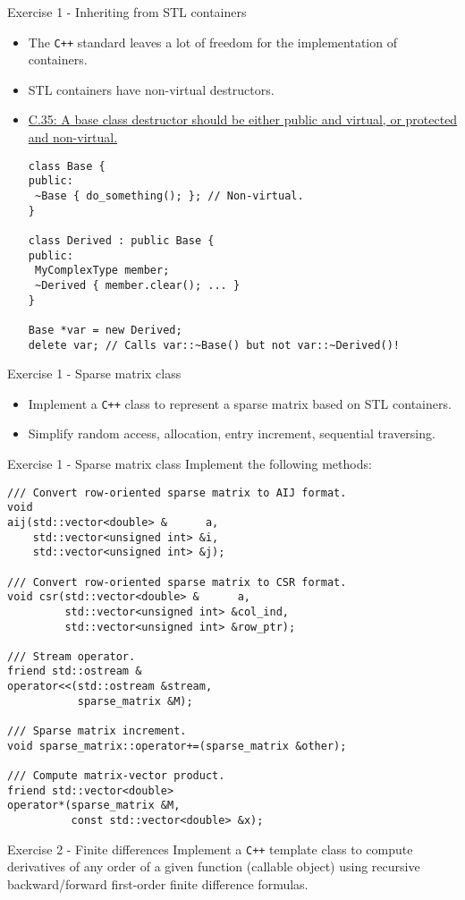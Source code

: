 \documentclass[10pt]{beamer}
\begin{document}
\begin{frame}[fragile]{Exercise 1 - Inheriting from STL containers}
\begin{itemize}
\item The \texttt{C++} standard leaves a lot of freedom for the implementation of containers.
\item STL containers have non-virtual destructors.
\item \href{http://isocpp.github.io/CppCoreGuidelines/CppCoreGuidelines\#Rc-dtor-virtual}{C.35: A base class destructor should be either public and virtual, or protected and non-virtual.}
\small\begin{lstlisting}
class Base {
public:
 ~Base { do_something(); }; // Non-virtual.
}

class Derived : public Base {
public:
 MyComplexType member;
 ~Derived { member.clear(); ... }
}

Base *var = new Derived;
delete var; // Calls var::~Base() but not var::~Derived()!
\end{lstlisting}\normalsize
\end{itemize}
\end{frame}


\begin{frame}[fragile]{Exercise 1 - Sparse matrix class}
\begin{itemize}
\item Implement a \texttt{C++} class to represent a sparse matrix based on STL containers.
\item Simplify random access, allocation, entry increment, sequential traversing.
\end{itemize}
\end{frame}


\begin{frame}[fragile]{Exercise 1 - Sparse matrix class}
Implement the following methods:
\begin{lstlisting}[basicstyle=\footnotesize]
/// Convert row-oriented sparse matrix to AIJ format.
void
aij(std::vector<double> &      a,
    std::vector<unsigned int> &i,
    std::vector<unsigned int> &j);

/// Convert row-oriented sparse matrix to CSR format.
void csr(std::vector<double> &      a,
         std::vector<unsigned int> &col_ind,
         std::vector<unsigned int> &row_ptr);

/// Stream operator.
friend std::ostream &
operator<<(std::ostream &stream,
           sparse_matrix &M);

/// Sparse matrix increment.
void sparse_matrix::operator+=(sparse_matrix &other);

/// Compute matrix-vector product.
friend std::vector<double>
operator*(sparse_matrix &M,
          const std::vector<double> &x);
\end{lstlisting}
\end{frame}

\begin{frame}[fragile]{Exercise 2 - Finite differences}
Implement a \texttt{C++} template class to compute derivatives of any order of a given function (callable object) using recursive backward/forward first-order finite difference formulas.
\end{frame}
\end{document}
